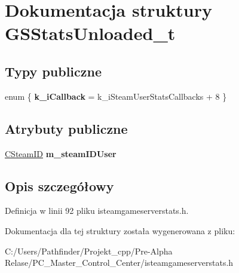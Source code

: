 \hypertarget{struct_g_s_stats_unloaded__t}{}\section{Dokumentacja struktury G\+S\+Stats\+Unloaded\+\_\+t}
\label{struct_g_s_stats_unloaded__t}
\subsection*{Typy publiczne}
\begin{DoxyCompactItemize}
\item 
\mbox{\label{struct_g_s_stats_unloaded__t_aa95f2623e41f669427f8d64d4adb4de6}} 
enum \{ {\bfseries k\+\_\+i\+Callback} = k\+\_\+i\+Steam\+User\+Stats\+Callbacks + 8
 \}
\end{DoxyCompactItemize}
\subsection*{Atrybuty publiczne}
\begin{DoxyCompactItemize}
\item 
\mbox{\label{struct_g_s_stats_unloaded__t_a5667f0651a5864239265b66ba982e513}} 
\hyperlink{class_c_steam_i_d}{C\+Steam\+ID} {\bfseries m\+\_\+steam\+I\+D\+User}
\end{DoxyCompactItemize}


\subsection{Opis szczegółowy}


Definicja w linii 92 pliku isteamgameserverstats.\+h.



Dokumentacja dla tej struktury została wygenerowana z pliku\+:\begin{DoxyCompactItemize}
\item 
C\+:/\+Users/\+Pathfinder/\+Projekt\+\_\+cpp/\+Pre-\/\+Alpha Relase/\+P\+C\+\_\+\+Master\+\_\+\+Control\+\_\+\+Center/isteamgameserverstats.\+h\end{DoxyCompactItemize}
